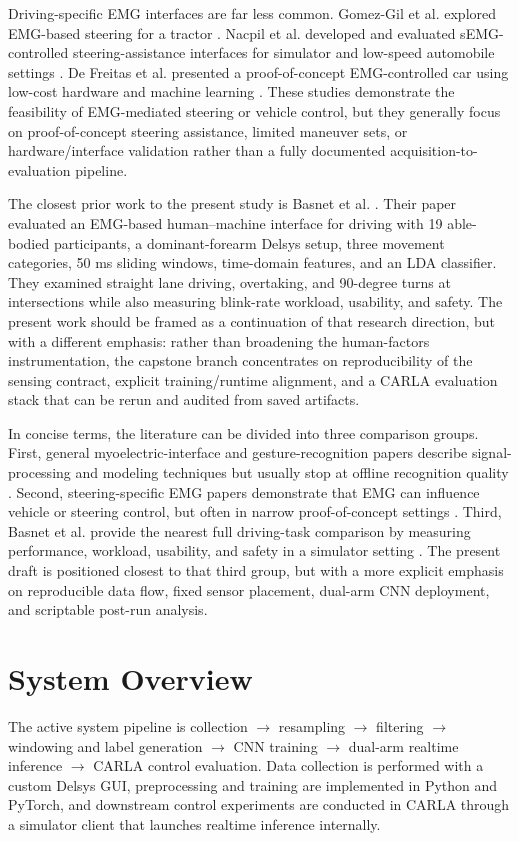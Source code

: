 \documentclass[11pt]{article}
\begin{document}
Driving-specific EMG interfaces are far less common. Gomez-Gil et al. explored EMG-based steering for a tractor \cite{gomezgil2011}. Nacpil et al. developed and evaluated sEMG-controlled steering-assistance interfaces for simulator and low-speed automobile settings \cite{nacpil2019,nacpil2020}. De Freitas et al. presented a proof-of-concept EMG-controlled car using low-cost hardware and machine learning \cite{defreitas2019}. These studies demonstrate the feasibility of EMG-mediated steering or vehicle control, but they generally focus on proof-of-concept steering assistance, limited maneuver sets, or hardware/interface validation rather than a fully documented acquisition-to-evaluation pipeline.

The closest prior work to the present study is Basnet et al. \cite{basnet2026}. Their paper evaluated an EMG-based human--machine interface for driving with 19 able-bodied participants, a dominant-forearm Delsys setup, three movement categories, 50 ms sliding windows, time-domain features, and an LDA classifier. They examined straight lane driving, overtaking, and 90-degree turns at intersections while also measuring blink-rate workload, usability, and safety. The present work should be framed as a continuation of that research direction, but with a different emphasis: rather than broadening the human-factors instrumentation, the capstone branch concentrates on reproducibility of the sensing contract, explicit training/runtime alignment, and a CARLA evaluation stack that can be rerun and audited from saved artifacts.

In concise terms, the literature can be divided into three comparison groups. First, general myoelectric-interface and gesture-recognition papers describe signal-processing and modeling techniques but usually stop at offline recognition quality \cite{hakonen2015,jaramillo2020,chen2020,shin2024}. Second, steering-specific EMG papers demonstrate that EMG can influence vehicle or steering control, but often in narrow proof-of-concept settings \cite{gomezgil2011,nacpil2019,nacpil2020,defreitas2019}. Third, Basnet et al. provide the nearest full driving-task comparison by measuring performance, workload, usability, and safety in a simulator setting \cite{basnet2026}. The present draft is positioned closest to that third group, but with a more explicit emphasis on reproducible data flow, fixed sensor placement, dual-arm CNN deployment, and scriptable post-run analysis.

\section{System Overview}
The active system pipeline is collection $\rightarrow$ resampling $\rightarrow$ filtering $\rightarrow$ windowing and label generation $\rightarrow$ CNN training $\rightarrow$ dual-arm realtime inference $\rightarrow$ CARLA control evaluation. Data collection is performed with a custom Delsys GUI, preprocessing and training are implemented in Python and PyTorch, and downstream control experiments are conducted in CARLA through a simulator client that launches realtime inference internally.
\end{document}
